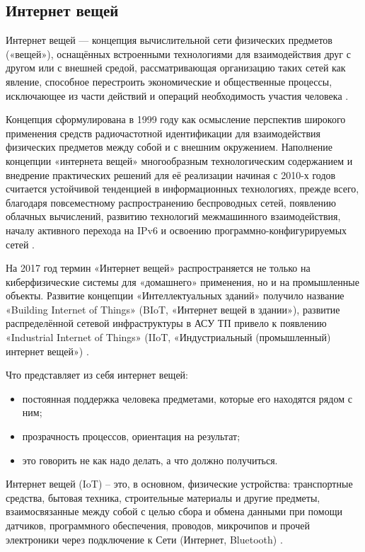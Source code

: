 \subsection{Интернет вещей}
\label{sec:subject:iot}

Интернет вещей — концепция вычислительной сети физических предметов («вещей»), оснащённых встроенными технологиями для взаимодействия друг с другом или с внешней средой, рассматривающая организацию таких сетей как явление, способное перестроить экономические и общественные процессы, исключающее из части действий и операций необходимость участия человека \cite{wiki_iot}.

Концепция сформулирована в 1999 году как осмысление перспектив широкого применения средств радиочастотной идентификации для взаимодействия физических предметов между собой и с внешним окружением. Наполнение концепции «интернета вещей» многообразным технологическим содержанием и внедрение практических решений для её реализации начиная с 2010-х годов считается устойчивой тенденцией в информационных технологиях, прежде всего, благодаря повсеместному распространению беспроводных сетей, появлению облачных вычислений, развитию технологий межмашинного взаимодействия, началу активного перехода на IPv6 и освоению программно-конфигурируемых сетей \cite{wiki_iot}.

На 2017 год термин «Интернет вещей» распространяется не только на киберфизические системы для «домашнего» применения, но и на промышленные объекты. Развитие концепции «Интеллектуальных зданий» получило название «Building Internet of Things» (BIoT, «Интернет вещей в здании»), развитие распределённой сетевой инфраструктуры в АСУ ТП привело к появлению «Industrial Internet of Things» (IIoT, «Индустриальный (промышленный) интернет вещей») \cite{wiki_iot}.

Что представляет из себя интернет вещей:
\begin{itemize}
	\item постоянная поддержка человека предметами, которые его находятся рядом с ним;
	\item прозрачность процессов, ориентация на результат;
	\item это говорить не как надо делать, а что должно получиться.
\end{itemize}

Интернет вещей (IoT) – это, в основном, физические устройства: транспортные средства, бытовая техника, строительные материалы и другие предметы, взаимосвязанные между собой с целью сбора и обмена данными при помощи датчиков, программного обеспечения, проводов, микрочипов и прочей электроники через подключение к Сети (Интернет, Bluetooth) \cite{what_is_iot}.

